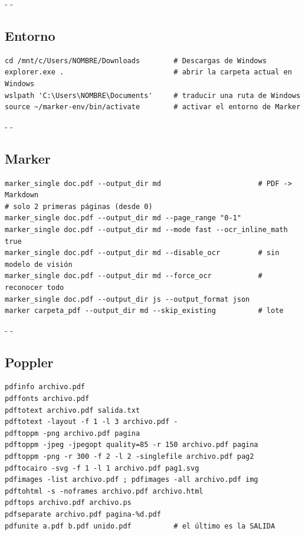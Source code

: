 \documentclass[11pt,a4paper]{article}
\makeatletter
\newcommand{\necesitaespacio}[1]{\par\penalty-100\begingroup
	\setlength{\dimen@}{#1}\dimen@ii\pagegoal\advance\dimen@ii-\pagetotal
	\ifdim\dimen@>\dimen@ii\ifdim\dimen@ii>\z@\vfil\fi\penalty-\@M\fi\endgroup}
\makeatother
\begin{document}
	\begingroup
	\lstset{basicstyle=\ttfamily\footnotesize, aboveskip=4pt, belowskip=6pt}
	
	\necesitaespacio{8\baselineskip}
	\subsection*{Entorno}
	\begin{lstlisting}
cd /mnt/c/Users/NOMBRE/Downloads        # Descargas de Windows
explorer.exe .                          # abrir la carpeta actual en Windows
wslpath 'C:\Users\NOMBRE\Documents'     # traducir una ruta de Windows
source ~/marker-env/bin/activate        # activar el entorno de Marker
\end{lstlisting}
	
	\necesitaespacio{8\baselineskip}
	\subsection*{Marker}
	\begin{lstlisting}
marker_single doc.pdf --output_dir md                       # PDF -> Markdown
# solo 2 primeras páginas (desde 0)
marker_single doc.pdf --output_dir md --page_range "0-1"
marker_single doc.pdf --output_dir md --mode fast --ocr_inline_math true
marker_single doc.pdf --output_dir md --disable_ocr         # sin modelo de visión
marker_single doc.pdf --output_dir md --force_ocr           # reconocer todo
marker_single doc.pdf --output_dir js --output_format json
marker carpeta_pdf --output_dir md --skip_existing          # lote
\end{lstlisting}
	
	\necesitaespacio{8\baselineskip}
	\subsection*{Poppler}
	\begin{lstlisting}
pdfinfo archivo.pdf
pdffonts archivo.pdf
pdftotext archivo.pdf salida.txt
pdftotext -layout -f 1 -l 3 archivo.pdf -
pdftoppm -png archivo.pdf pagina
pdftoppm -jpeg -jpegopt quality=85 -r 150 archivo.pdf pagina
pdftoppm -png -r 300 -f 2 -l 2 -singlefile archivo.pdf pag2
pdftocairo -svg -f 1 -l 1 archivo.pdf pag1.svg
pdfimages -list archivo.pdf ; pdfimages -all archivo.pdf img
pdftohtml -s -noframes archivo.pdf archivo.html
pdftops archivo.pdf archivo.ps
pdfseparate archivo.pdf pagina-%d.pdf
pdfunite a.pdf b.pdf unido.pdf          # el último es la SALIDA
\end{lstlisting}
	
\end{document}
